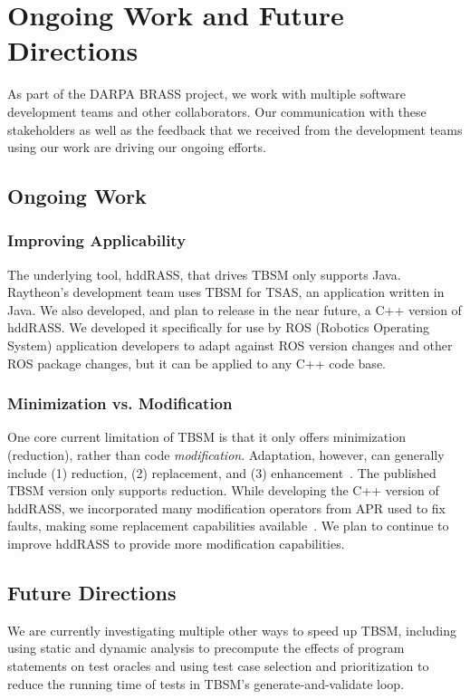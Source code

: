 \section{Ongoing Work and Future Directions}
As part of the DARPA BRASS project, we work with multiple software development teams and other collaborators. Our communication with these stakeholders as well as the feedback that we received from the development teams using our work are driving our ongoing efforts.
\subsection{Ongoing Work}
\subsubsection{Improving Applicability}
The underlying tool, hddRASS, that drives TBSM only supports Java. Raytheon's development team uses TBSM for TSAS, an application written in Java.  We also developed, and plan to release in the near future, a C++ version of hddRASS.  We developed it specifically for use by ROS (Robotics Operating System) application developers to adapt against ROS version changes and other ROS package changes, but it can be applied to any C++ code base.

\subsubsection{Minimization vs. Modification}
One core current limitation of TBSM is that it only offers minimization (reduction), rather than code \emph{modification}. Adaptation, however, can generally include (1) reduction, (2) replacement, and (3) enhancement~\cite{hughes2016building}. The published TBSM version only supports reduction. While developing the C++ version of hddRASS, we incorporated many modification operators from APR used to fix faults, making some replacement capabilities available~\cite{Forrest2009genetic,Arcuri2009phdthesis,Debroy2010using}. We plan to continue to improve hddRASS to provide more modification capabilities. 

\subsection{Future Directions}
We are currently investigating multiple other ways to speed up TBSM, including using static and dynamic analysis to precompute the effects of program statements on test oracles and using test case selection and prioritization to reduce the running time of tests in TBSM’s generate-and-validate loop.


